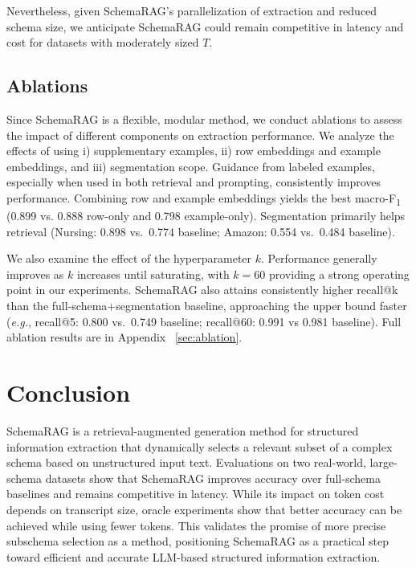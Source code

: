 \documentclass[11pt]{article}
\begin{document}
Nevertheless, given SchemaRAG's parallelization of extraction and reduced schema size, we anticipate SchemaRAG could remain competitive in latency and cost for datasets with moderately sized $T$.




\subsection{Ablations} 
Since SchemaRAG is a flexible, modular method, we conduct ablations to assess the impact of different components on extraction performance. We analyze the effects of using i) supplementary examples, ii) row embeddings and example embeddings, and iii) segmentation scope. 
Guidance from labeled examples, especially when used in both retrieval and prompting, consistently improves performance. Combining row and example embeddings yields the best macro-F\textsubscript{1} (0.899 vs. 0.888 row-only and 0.798 example-only). Segmentation primarily helps retrieval (Nursing: 0.898 vs.\ 0.774 baseline; Amazon: 0.554 vs.\ 0.484 baseline). 

We also examine the effect of the hyperparameter $k$. Performance generally improves as $k$ increases until saturating, with $k{=}60$ providing a strong operating point in our experiments. 
SchemaRAG also attains consistently higher recall@k than the full-schema+segmentation baseline,  approaching the upper bound faster (\textit{e.g.}, recall@5: 0.800 vs.\ 0.749 baseline; recall@60: 0.991 vs 0.981 baseline). 
Full ablation results are in Appendix ~\ref{sec:ablation}. 



\section{Conclusion}

SchemaRAG is a retrieval-augmented generation method for structured information extraction that dynamically selects a relevant subset of a complex schema based on unstructured input text. Evaluations on two real-world, large-schema datasets show that SchemaRAG improves accuracy over full-schema baselines and remains competitive in latency. 
While its impact on token cost depends on transcript size, oracle experiments show that better accuracy can be achieved while using fewer tokens. This validates the promise of more precise subschema selection as a method, positioning SchemaRAG as a practical step toward efficient and accurate LLM-based structured information extraction.
\end{document}
